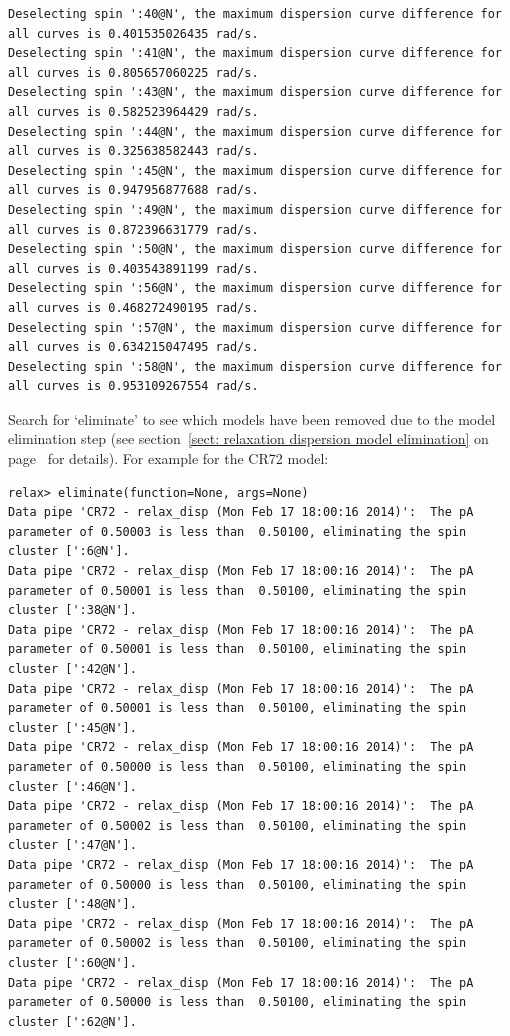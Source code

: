 \begin{lstlisting}[basicstyle=\ttfamily \tiny,language=relax_log,numbers=none]
Deselecting spin ':40@N', the maximum dispersion curve difference for all curves is 0.401535026435 rad/s.
Deselecting spin ':41@N', the maximum dispersion curve difference for all curves is 0.805657060225 rad/s.
Deselecting spin ':43@N', the maximum dispersion curve difference for all curves is 0.582523964429 rad/s.
Deselecting spin ':44@N', the maximum dispersion curve difference for all curves is 0.325638582443 rad/s.
Deselecting spin ':45@N', the maximum dispersion curve difference for all curves is 0.947956877688 rad/s.
Deselecting spin ':49@N', the maximum dispersion curve difference for all curves is 0.872396631779 rad/s.
Deselecting spin ':50@N', the maximum dispersion curve difference for all curves is 0.403543891199 rad/s.
Deselecting spin ':56@N', the maximum dispersion curve difference for all curves is 0.468272490195 rad/s.
Deselecting spin ':57@N', the maximum dispersion curve difference for all curves is 0.634215047495 rad/s.
Deselecting spin ':58@N', the maximum dispersion curve difference for all curves is 0.953109267554 rad/s.
\end{lstlisting}

Search for `eliminate' to see which models have been removed due to the model elimination step (see section~\ref{sect: relaxation dispersion model elimination} on page~\pageref{sect: relaxation dispersion model elimination} for details).
For example for the CR72 model:

\begin{lstlisting}[basicstyle=\ttfamily \tiny,language=relax_log,numbers=none]
relax> eliminate(function=None, args=None)
Data pipe 'CR72 - relax_disp (Mon Feb 17 18:00:16 2014)':  The pA parameter of 0.50003 is less than  0.50100, eliminating the spin cluster [':6@N'].
Data pipe 'CR72 - relax_disp (Mon Feb 17 18:00:16 2014)':  The pA parameter of 0.50001 is less than  0.50100, eliminating the spin cluster [':38@N'].
Data pipe 'CR72 - relax_disp (Mon Feb 17 18:00:16 2014)':  The pA parameter of 0.50001 is less than  0.50100, eliminating the spin cluster [':42@N'].
Data pipe 'CR72 - relax_disp (Mon Feb 17 18:00:16 2014)':  The pA parameter of 0.50001 is less than  0.50100, eliminating the spin cluster [':45@N'].
Data pipe 'CR72 - relax_disp (Mon Feb 17 18:00:16 2014)':  The pA parameter of 0.50000 is less than  0.50100, eliminating the spin cluster [':46@N'].
Data pipe 'CR72 - relax_disp (Mon Feb 17 18:00:16 2014)':  The pA parameter of 0.50002 is less than  0.50100, eliminating the spin cluster [':47@N'].
Data pipe 'CR72 - relax_disp (Mon Feb 17 18:00:16 2014)':  The pA parameter of 0.50000 is less than  0.50100, eliminating the spin cluster [':48@N'].
Data pipe 'CR72 - relax_disp (Mon Feb 17 18:00:16 2014)':  The pA parameter of 0.50002 is less than  0.50100, eliminating the spin cluster [':60@N'].
Data pipe 'CR72 - relax_disp (Mon Feb 17 18:00:16 2014)':  The pA parameter of 0.50000 is less than  0.50100, eliminating the spin cluster [':62@N'].
\end{lstlisting}

